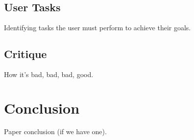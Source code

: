 \documentclass{sigchi}
\begin{document}
\subsection{User Tasks}
Identifying tasks the user must perform to achieve their goals.

\subsection{Critique}
How it's bad, bad, bad, good.









\section{Conclusion}
Paper conclusion (if we have one).




%
%
%
%
%
\balance



\end{document}
